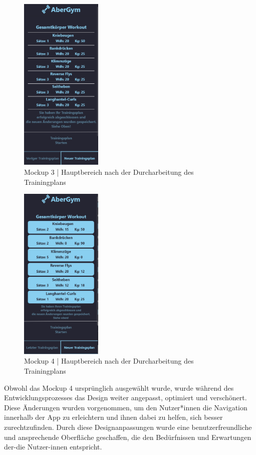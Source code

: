 \begin{figure}[!htb]
    \centering
    \includegraphics[width=0.35\textwidth]{pics/finished3.png}
    \caption{Mockup 3 | Hauptbereich nach der Durcharbeitung des Trainingplans}
    \label{fig:finished3}
\end{figure}
\begin{figure}[!htb]
    \centering
    \includegraphics[width=0.35\textwidth]{pics/finished4.png}
    \caption{Mockup 4 | Hauptbereich nach der Durcharbeitung des Trainingplans}
    \label{fig:finished4}
\end{figure}
\FloatBarrier

Obwohl das Mockup 4 ursprünglich ausgewählt wurde, wurde während des Entwicklungsprozesses das Design weiter angepasst, optimiert und verschönert. Diese Änderungen wurden vorgenommen, um den Nutzer*innen die Navigation innerhalb der App zu erleichtern und ihnen dabei zu helfen, sich besser zurechtzufinden. Durch diese Designanpassungen wurde eine benutzerfreundliche und ansprechende Oberfläche geschaffen, die den Bedürfnissen und Erwartungen der-die Nutzer-innen entspricht.
